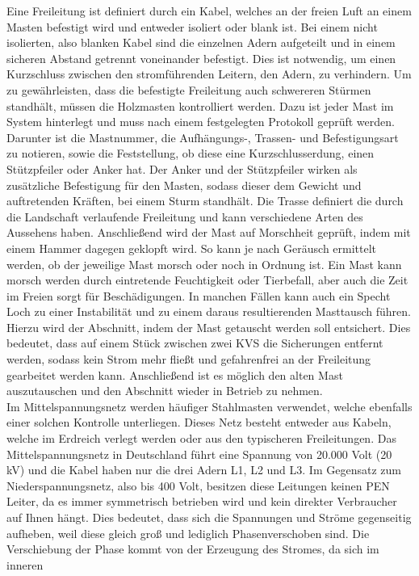 Eine Freileitung ist definiert durch ein Kabel, welches an der freien Luft an einem Masten befestigt wird und entweder isoliert oder blank ist. Bei einem 
nicht isolierten, also blanken Kabel sind die einzelnen Adern aufgeteilt und in einem sicheren Abstand getrennt voneinander befestigt. Dies ist notwendig, 
um einen Kurzschluss zwischen den stromführenden Leitern, den Adern, zu verhindern. Um zu gewährleisten, dass die befestigte Freileitung auch schwereren 
Stürmen standhält, müssen die Holzmasten kontrolliert werden. Dazu ist jeder Mast im System hinterlegt und muss nach einem festgelegten Protokoll geprüft
werden. Darunter ist die Mastnummer, die Aufhängungs-, Trassen- und Befestigungsart zu notieren, sowie die Feststellung, ob diese eine Kurzschlusserdung, 
einen Stützpfeiler oder Anker hat. Der Anker und der Stützpfeiler wirken als zusätzliche Befestigung für den Masten, sodass dieser dem Gewicht und auftretenden
Kräften, bei \zB einem Sturm standhält. Die Trasse definiert die durch die Landschaft verlaufende Freileitung und kann verschiedene Arten des Aussehens haben. 
Anschließend wird der Mast auf Morschheit geprüft, indem mit einem Hammer dagegen geklopft wird. So kann je nach Geräusch ermittelt werden, ob der 
jeweilige Mast morsch oder noch in Ordnung ist. Ein Mast kann morsch werden durch eintretende Feuchtigkeit oder Tierbefall, aber auch die Zeit im Freien 
sorgt für Beschädigungen. In manchen Fällen kann auch ein Specht Loch zu einer Instabilität und zu einem daraus resultierenden Masttausch führen. Hierzu 
wird der Abschnitt, indem der Mast getauscht werden soll entsichert. Dies bedeutet, dass auf einem Stück zwischen zwei KVS die Sicherungen entfernt werden, 
sodass kein Strom mehr fließt und gefahrenfrei an der Freileitung gearbeitet werden kann. Anschließend ist es möglich den alten Mast auszutauschen und 
den Abschnitt wieder in Betrieb zu nehmen.
 \\
Im Mittelspannungsnetz werden häufiger Stahlmasten verwendet, welche ebenfalls einer solchen Kontrolle unterliegen. Dieses Netz besteht entweder aus Kabeln, 
welche im Erdreich verlegt werden oder aus den typischeren Freileitungen. Das Mittelspannungsnetz in Deutschland führt eine Spannung von 20.000 Volt (20 kV) 
und die Kabel haben nur die drei Adern L1, L2 und L3. Im Gegensatz zum Niederspannungsnetz, also bis 400 Volt, besitzen diese Leitungen keinen PEN Leiter, 
da es immer symmetrisch betrieben wird und kein direkter Verbraucher auf Ihnen hängt. Dies bedeutet, dass sich die Spannungen und Ströme gegenseitig 
aufheben, weil diese gleich groß und lediglich Phasenverschoben sind. Die Verschiebung der Phase kommt von der Erzeugung des Stromes, da sich im inneren 
